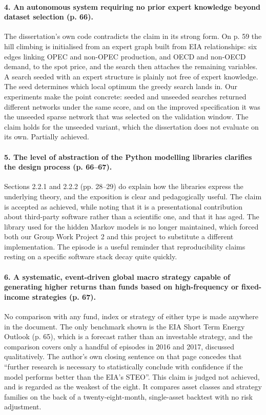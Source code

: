 \documentclass[11pt,a4paper]{article}
\begin{document}
\paragraph{4. An autonomous system requiring no prior expert knowledge beyond dataset selection
(p. 66).} The dissertation's own code contradicts the claim in its strong form. On p. 59 the hill
climbing is initialised from an expert graph built from EIA relationships: six edges linking
OPEC and non-OPEC production, and OECD and non-OECD demand, to the spot price, and the search
then attaches the remaining variables. A search seeded with an expert structure is plainly not
free of expert knowledge. The seed determines which local optimum the greedy search lands in. Our
experiments make the point concrete: seeded and unseeded searches returned different networks
under the same score, and on the improved specification it was the unseeded sparse network that
was selected on the validation window. The claim holds for the unseeded variant, which the
dissertation does not evaluate on its own. Partially achieved.

\paragraph{5. The level of abstraction of the Python modelling libraries clarifies the design
process (p. 66--67).} Sections 2.2.1 and 2.2.2 (pp. 28--29) do explain how the libraries express
the underlying theory, and the exposition is clear and pedagogically useful. The claim is accepted
as achieved, while noting that it is a presentational contribution about third-party software
rather than a scientific one, and that it has aged. The library used for the hidden Markov models
is no longer maintained, which forced both our Group Work Project 2 and this project to substitute
a different implementation. The episode is a useful reminder that reproducibility claims resting
on a specific software stack decay quite quickly.

\paragraph{6. A systematic, event-driven global macro strategy capable of generating higher returns
than funds based on high-frequency or fixed-income strategies (p. 67).} No comparison with any
fund, index or strategy of either type is made anywhere in the document. The only benchmark
shown is the EIA Short Term Energy Outlook (p. 65), which is a forecast rather than an investable
strategy, and the comparison covers only a handful of episodes in 2016 and 2017, discussed
qualitatively. The author's own closing sentence on that page concedes that ``further research is
necessary to statistically conclude with confidence if the model performs better than the EIA's
STEO''. This claim is judged not achieved, and is regarded as the weakest of the eight. It
compares asset classes and strategy families on the back of a twenty-eight-month, single-asset
backtest with no risk adjustment.
\end{document}
